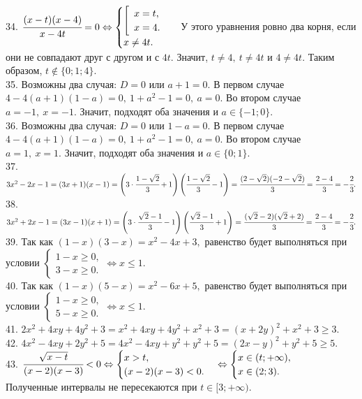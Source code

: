 \documentclass[12pt]{article}
\begin{document}
34. $\cfrac{(x-t)(x-4)}{x-4t}=0\Leftrightarrow\begin{cases}\left[\begin{array}{l}x=t,\\ x=4.\end{array}\right.\\x\neq4t.\end{cases}$ У этого уравнения ровно два корня, если они не совпадают друг с другом и с $4t.$ Значит, $t\neq4,\ t\neq4t$ и $4\neq4t.$ Таким образом, $t\notin\{0; 1; 4\}.$\\
35. Возможны два случая: $D=0$ или $a+1=0.$ В первом случае $4-4(a+1)(1-a)=0,\ 1+a^2-1=0,\ a=0.$ Во втором случае $a=-1,\ x=-1.$ Значит, подходят оба значения и $a\in\{-1;0\}.$\\
36. Возможны два случая: $D=0$ или $1-a=0.$ В первом случае $4-4(a+1)(1-a)=0,\ 1+a^2-1=0,\ a=0.$ Во втором случае $a=1,\ x=1.$ Значит, подходят оба значения и $a\in\{0;1\}.$\\
37. $3x^2-2x-1=(3x+1)(x-1)=\left(3\cdot\cfrac{1-\sqrt{2}}{3}+1\right)\left(\cfrac{1-\sqrt{2}}{3}-1\right)=\cfrac{(2-\sqrt{2})(-2-\sqrt{2})}{3}=\cfrac{2-4}{3}=-\cfrac{2}{3}.$\\
38. $3x^2+2x-1=(3x-1)(x+1)=\left(3\cdot\cfrac{\sqrt{2}-1}{3}-1\right)\left(\cfrac{\sqrt{2}-1}{3}+1\right)=\cfrac{(\sqrt{2}-2)(\sqrt{2}+2)}{3}=\cfrac{2-4}{3}=-\cfrac{2}{3}.$\\
39. Так как $(1-x)(3-x)=x^2-4x+3,$ равенство будет выполняться при условии $\begin{cases}1-x\geqslant0,\\ 3-x\geqslant0.\end{cases}\Leftrightarrow x\leqslant1.$\\
40. Так как $(1-x)(5-x)=x^2-6x+5,$ равенство будет выполняться при условии $\begin{cases}1-x\geqslant0,\\ 5-x\geqslant0.\end{cases}\Leftrightarrow x\leqslant1.$\\
41. $2x^2+4xy+4y^2+3=x^2+4xy+4y^2+x^2+3=(x+2y)^2+x^2+3\geqslant3.$\\
42. $4x^2-4xy+2y^2+5=4x^2-4xy+y^2+y^2+5=(2x-y)^2+y^2+5\geqslant5.$\\
43. $\cfrac{\sqrt{x-t}}{(x-2)(x-3)}<0\Leftrightarrow \begin{cases}x>t,\\(x-2)(x-3)<0.\end{cases}
\Leftrightarrow \begin{cases}x\in(t;+\infty),\\ x\in(2;3).\end{cases}$ Полученные интервалы не пересекаются при $t\in[3;+\infty).$\\
\end{document}
